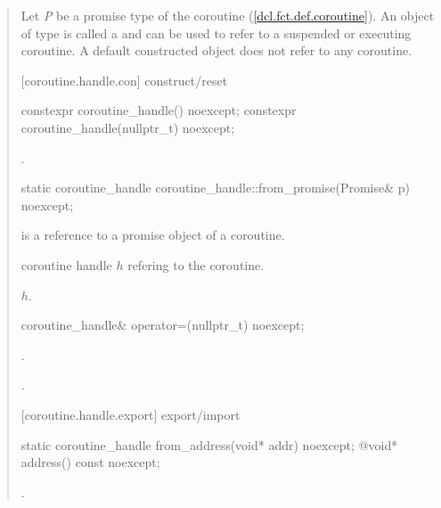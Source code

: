 \begin{quote}
\pnum
Let \textit{P} be a promise type of the coroutine (\ref{dcl.fct.def.coroutine}). An object of type  is called a 
and can be used to refer to a suspended or executing coroutine.
A default constructed  object does not refer to any coroutine.



[coroutine.handle.con]{ construct/reset}
\begin{itemdecl}
  constexpr coroutine_handle() noexcept;		
  constexpr coroutine_handle(nullptr_t) noexcept;
\end{itemdecl}
\begin{itemdescr}
  \pnum\postconditions {}.
\end{itemdescr}

\begin{itemdecl}
  static coroutine_handle coroutine_handle::from_promise(Promise& p) noexcept;	
\end{itemdecl}
\begin{itemdescr}
  \pnum
  \precondition {} is a reference to a promise object of a coroutine.
  
	\pnum
  \returns coroutine handle $h$ refering to the coroutine.
  
  \pnum\postconditions {}$h$.
\end{itemdescr}

\begin{itemdecl}
  coroutine_handle& operator=(nullptr_t) noexcept;
\end{itemdecl}
\begin{itemdescr}
	\pnum\postconditions {}.
  
  \pnum\returns {}.
\end{itemdescr}

[coroutine.handle.export]{ export/import}
\begin{itemdecl}
  static coroutine_handle from_address(void* addr) noexcept;		
  @\cbstart{}\cbend@ void* address() const noexcept;
\end{itemdecl}

\begin{itemdescr}
  \pnum
  \postconditions {}.
\end{itemdescr}


\end{quote}
